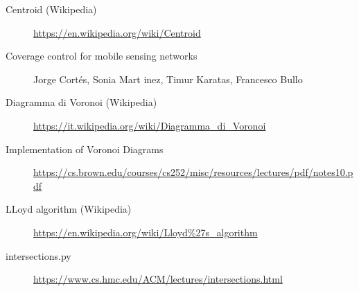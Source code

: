 \documentclass[11pt,a4paper]{report}
\begin{document}
\begin{description}
	\item[Centroid (Wikipedia)] \url{https://en.wikipedia.org/wiki/Centroid}
	\item[Coverage control for mobile sensing networks] Jorge Cortés, Sonia Mart inez, Timur Karatas, Francesco Bullo
	\item[Diagramma di Voronoi (Wikipedia)] \url{https://it.wikipedia.org/wiki/Diagramma_di_Voronoi}
	\item[Implementation of Voronoi Diagrams] \url{https://cs.brown.edu/courses/cs252/misc/resources/lectures/pdf/notes10.pdf}
	\item[LLoyd algorithm (Wikipedia)] \url{https://en.wikipedia.org/wiki/Lloyd%27s_algorithm}
	\item[intersections.py] \url{https://www.cs.hmc.edu/ACM/lectures/intersections.html}
\end{description}
\end{document}

